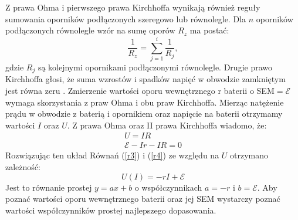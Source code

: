 \documentclass[10pt,a4paper]{article}
\begin{document}
Z prawa Ohma i pierwszego prawa Kirchhoffa wynikają również reguły sumowania oporników podłączonych szeregowo lub równolegle. Dla $n$ oporników podłączonych równolegle wzór na sumę oporów $R_{z}$ ma postać:
\begin{equation}
\dfrac{1}{R_{z}}=\sum_{j=1}^{i}\dfrac{1}{R_{j}},
\label{r2}
\end{equation}
gdzie $R_{j}$ są kolejnymi opornikami podłączonymi równolegle.
Drugie prawo Kirchhoffa głosi, że suma wzrostów i spadków napięć w obwodzie zamkniętym jest równa zeru \cite{hrw3}.
Zmierzenie wartości oporu wewnętrznego r baterii o SEM$=\mathcal{E}$ wymaga skorzystania z praw Ohma i obu praw Kirchhoffa. Mierząc natężenie prądu w obwodzie z baterią i opornikiem oraz napięcie na baterii otrzymamy wartości $I$ oraz $U$. Z prawa Ohma oraz II prawa Kirchhoffa wiadomo, że:
\begin{eqnarray}
U=IR \\
\label{r3}
\mathcal{E}-Ir-IR=0
\label{r4}
\end{eqnarray}
Rozwiązując ten układ Równań (\ref{r3}) i (\ref{r4}) ze względu na $U$ otrzymano zależność:
\begin{equation}
U(I)=-rI+\mathcal{E}
\label{r5}
\end{equation}
Jest to równanie prostej $y=ax+b$ o współczynnikach $a=-r$ i $b=\mathcal{E}$. Aby poznać wartości oporu wewnętrznego baterii oraz jej SEM wystarczy poznać wartości współczynników prostej najlepszego dopasowania.
\end{document}

